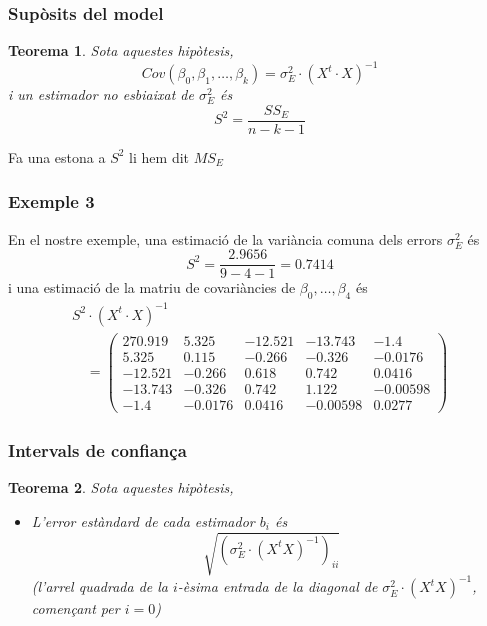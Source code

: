 \documentclass[12pt,t]{beamer}
\theoremstyle{plain}
\newtheorem{teorema}{Teorema}
\theoremstyle{definition}
\begin{document}
\begin{frame}
\frametitle{Supòsits del model}

\begin{teorema}
Sota aquestes hipòtesis, 
$$
Cov(\beta_0,\beta_1,\ldots,\beta_k)= \sigma_E^2\cdot (X^t\cdot X)^{-1}
$$
i un estimador no esbiaixat de $\sigma_E^2$ és
$$
S^2=\frac{SS_E}{n-k-1}
$$
\end{teorema}
Fa una estona a $S^2$ li hem dit $MS_E$

\end{frame}





\begin{frame}
\frametitle{Exemple 3}
En el nostre exemple, una estimació de la variància comuna dels errors $\sigma_E^2$ és
$$
S^2 = \frac{2.9656}{9-4-1}=0.7414
$$
i una estimació de la matriu de covariàncies de $\beta_0,\ldots, \beta_4$ és
{\footnotesize 
$$
\begin{array}{l}
S^2\cdot (X^t\cdot X)^{-1}\\[2ex]
\quad  =
\left(
\begin{array}{ccccc}
270.919 & 5.325 & -12.521 & -13.743 & -1.4 \\
5.325 & 0.115 & -0.266 & -0.326 & -0.0176 \\
-12.521 & -0.266 & 0.618 & 0.742 & 0.0416 \\
-13.743 & -0.326 & 0.742 & 1.122 & -0.00598 \\
-1.4 & -0.0176 & 0.0416 & -0.00598 & 0.0277
\end{array}
\right)
\end{array}
$$
}
\end{frame}






\begin{frame}
\frametitle{Intervals de confiança}
\begin{teorema}
Sota aquestes hipòtesis, 
\begin{itemize}
\item L'error estàndard de cada estimador $b_i$ és 
$$
\sqrt{(\sigma_E^2\cdot (X^t X)^{-1})_{ii}}
$$
(l'arrel quadrada de la $i$-èsima entrada de la diagonal de $\sigma_E^2\cdot (X^t X)^{-1}$, començant per $i=0$)
\end{itemize}
\end{teorema}
\end{frame}
\end{document}

